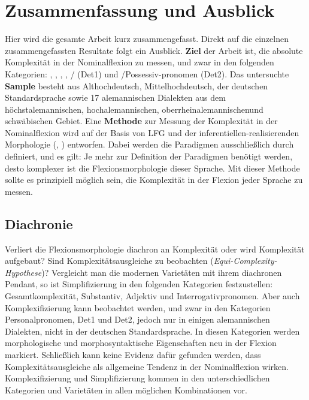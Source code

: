 \chapter{Zusammenfassung und Ausblick}\label{7}

Hier wird die gesamte Arbeit kurz zusammengefasst. Direkt auf die einzelnen zusammengefassten Resultate folgt ein Ausblick. \textbf{Ziel} der Arbeit ist, die absolute Komplexität in der Nominalflexion zu messen, und zwar in den folgenden Kategorien: , , , , /  (Det1) und \slash Possessiv-\linebreak pronomen (Det2). Das untersuchte \textbf{Sample} besteht aus Althochdeutsch, Mittelhochdeutsch, der deutschen Standardsprache sowie 17 alemannischen Dialekten aus dem höchstalemannischen, hochalemannischen, oberrheinalemannischen\linebreak und schwäbischen Gebiet. Eine \textbf{Methode} zur Messung der Komplexität in der Nominalflexion wird auf der Basis von LFG und der in\-fe\-ren\-tiel\-len-re\-a\-li\-sie\-ren\-den Morphologie (\citealt{Stump2001}, \citealt{AckermanStump2004}) entworfen. Dabei werden die Paradigmen ausschließlich durch  definiert, und es gilt: Je mehr  zur Definition der Paradigmen benötigt werden, desto komplexer ist die Flexionsmorphologie dieser Sprache. Mit dieser Methode sollte es prinzipiell möglich sein, die Komplexität in der Flexion jeder Sprache zu messen.\\


\section{Diachronie} Verliert die Flexionsmorphologie diachron an Komplexität oder wird Komplexität aufgebaut? Sind Komplexitätsausgleiche zu beobachten (\textit{Equi-Com\-ple\-xi\-ty-Hy\-po\-the\-se})? Vergleicht man die modernen Varietäten mit ihrem diachronen Pendant, so ist Simplifizierung in den folgenden Kategorien festzustellen: Gesamtkomplexität, Substantiv, Adjektiv und Interrogativpronomen. Aber auch Komplexifizierung kann beobachtet werden, und zwar in den Kategorien Personalpronomen, Det1 und Det2, jedoch nur in einigen alemannischen Dialekten, nicht in der deutschen Standardsprache. In diesen Kategorien werden morphologische und morphosyntaktische Eigenschaften neu in der Flexion markiert. Schließlich kann keine Evidenz dafür gefunden werden, dass Komplexitätsausgleiche als allgemeine Tendenz in der Nominalflexion wirken. Komplexifizierung und Simplifizierung kommen in den unterschiedlichen Kategorien und Varietäten in allen möglichen Kombinationen vor.

